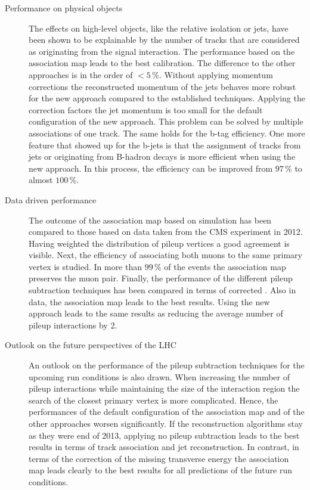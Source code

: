 \begin{description}
\item[Performance on physical objects] The effects on high-level objects, like the relative isolation or jets, have been shown to be explainable by the number of tracks that are considered as originating from the signal interaction. The performance based on the association map leads to the best \MET{} calibration. The difference to the other approaches is in the order of $<5\,\%$. Without applying momentum corrections the reconstructed momentum of the jets behaves more robust for the new approach compared to the established techniques. Applying the correction factors the jet momentum is too small for the default configuration of the new approach. This problem can be solved by multiple associations of one track. The same holds for the b-tag efficiency. One more feature that showed up for the b-jets is that the assignment of tracks from jets or originating from B-hadron decays is more efficient when using the new approach. In this process, the efficiency can be improved from $97\,\%$ to almost $100\,\%$.

\item[Data driven performance] The outcome of the association map based on simulation has been compared to those based on data taken from the CMS experiment in 2012. Having weighted the distribution of pileup vertices a good agreement is visible. Next, the efficiency of associating both muons to the same primary vertex is studied. In more than $99\,\%$ of the events the association map preserves the muon pair. Finally, the performance of the different pileup subtraction techniques has been compared in terms of corrected \MET{}. Also in data, the association map leads to the best results. Using the new approach leads to the same results as reducing the average number of pileup interactions by 2.

\item[Outlook on the future perspectives of the LHC] An outlook on the performance of the pileup subtraction techniques for the upcoming run conditions is also drawn. When increasing the number of pileup interactions while maintaining the size of the interaction region the search of the closest primary vertex is more complicated. Hence, the performances of the default configuration of the association map and of the other approaches worsen significantly. If the reconstruction algorithms stay as they were end of 2013, applying no pileup subtraction leads to the best results in terms of track association and jet reconstruction. In contrast, in terms of the correction of the missing transverse energy the association map leads clearly to the best results for all predictions of the future run conditions.

\end{description}


